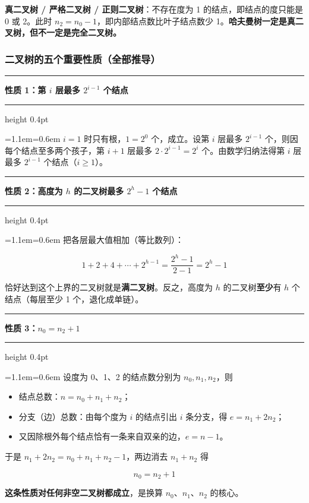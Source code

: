 \documentclass[11pt,openany,UTF8]{ctexbook}
\newcommand{\callouthead}[2]{%
  \par\addvspace{7pt}\noindent
  {\color{#1}\rule[-0.15em]{3pt}{1.05em}}\hspace{0.5em}%
  {\bfseries\color{#1}#2}\par\nobreak\vspace{-0.35em}%
  {\color{rulesep}\hrule height 0.4pt}\nobreak\vspace{0.45em}%
  \begingroup\small\setlength{\parindent}{0pt}%
  \leftskip=1.1em\rightskip=0.6em\noindent\ignorespaces}
\newcommand{\calloutend}{\par\endgroup\addvspace{7pt}}
\newenvironment{callkey}[1]{\callouthead{keybar}{#1}}{\calloutend}
\begin{document}
\textbf{真二叉树 / 严格二叉树 / 正则二叉树}：不存在度为 1 的结点，即结点的度只能是 0 或 2。此时 $n_2=n_0-1$，即内部结点数比叶子结点数少 1。\textbf{哈夫曼树一定是真二叉树，但不一定是完全二叉树。}

\subsubsection{二叉树的五个重要性质（全部推导）}

\begin{callkey}{性质 1：第 $i$ 层最多 $2^{i-1}$ 个结点}
$i=1$ 时只有根，$1=2^{0}$ 个，成立。设第 $i$ 层最多 $2^{i-1}$ 个，则因每个结点至多两个孩子，第 $i+1$ 层最多 $2\cdot2^{i-1}=2^{i}$ 个。由数学归纳法得第 $i$ 层最多 $2^{i-1}$ 个结点（$i\ge1$）。

\end{callkey}

\begin{callkey}{性质 2：高度为 $h$ 的二叉树最多 $2^h-1$ 个结点}
把各层最大值相加（等比数列）：

\[1+2+4+\cdots+2^{h-1}=\frac{2^h-1}{2-1}=2^h-1\]

恰好达到这个上界的二叉树就是\textbf{满二叉树}。反之，高度为 $h$ 的二叉树\textbf{至少}有 $h$ 个结点（每层至少 1 个，退化成单链）。

\end{callkey}

\begin{callkey}{性质 3：$n_0=n_2+1$}
设度为 0、1、2 的结点数分别为 $n_0,n_1,n_2$，则

\begin{itemize}
\item 结点总数：$n=n_0+n_1+n_2$；
\item 分支（边）总数：由每个度为 $i$ 的结点引出 $i$ 条分支，得 $e=n_1+2n_2$；
\item 又因除根外每个结点恰有一条来自双亲的边，$e=n-1$。
\end{itemize}
于是 $n_1+2n_2=n_0+n_1+n_2-1$，两边消去 $n_1+n_2$ 得

\[n_0=n_2+1\]

\textbf{这条性质对任何非空二叉树都成立}，是换算 $n_0$、$n_1$、$n_2$ 的核心。

\end{callkey}
\end{document}
